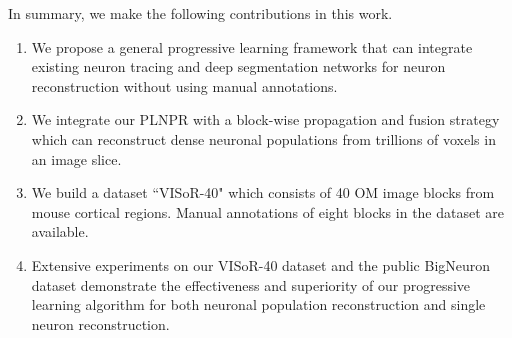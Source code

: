 %


In summary, we make the following contributions in this work. 
\begin{enumerate}
\item We propose a general progressive learning framework that can integrate existing neuron tracing and deep segmentation networks for neuron reconstruction without using manual annotations.

\item We integrate our PLNPR with a block-wise propagation and fusion strategy which can reconstruct dense neuronal populations from trillions of voxels in an image slice. 

\item We build a dataset ``VISoR-40" which consists of 40 OM image blocks from mouse cortical regions. Manual annotations of eight blocks in the dataset are available. 
\item Extensive experiments on our VISoR-40 dataset and the public BigNeuron dataset demonstrate the effectiveness and superiority of our progressive learning algorithm for both neuronal population reconstruction and single neuron reconstruction.
\end{enumerate}

